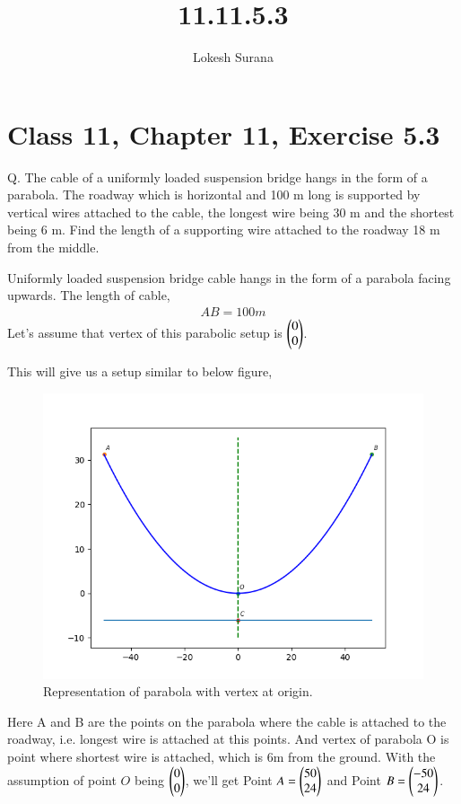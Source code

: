 \documentclass[journal,12pt,twocolumn]{IEEEtran}
\begin{document}
\vspace{3cm}
\title{11.11.5.3}
\author{Lokesh Surana}
\maketitle
\section*{Class 11, Chapter 11, Exercise 5.3}

Q. The cable of a uniformly loaded suspension bridge hangs in the form of a parabola. The roadway which is horizontal and 100 m long is supported by vertical wires attached to the cable, the longest wire being 30 m and the shortest being 6 m. Find the length of a supporting wire attached to the roadway 18 m from the middle.

\solution
Uniformly loaded suspension bridge cable hangs in the form of a parabola facing upwards.
The length of cable,
\begin{align}
    AB = 100m
\end{align}
Let's assume that vertex of this parabolic setup is $\begin{pmatrix}0\\0\end{pmatrix}$.

This will give us a setup similar to below figure,
\begin{figure}[!htb]
    \centering
    \includegraphics[width=\columnwidth]{figs/1.png}
    \caption{Representation of parabola with vertex at origin.}
    \label{fig:Cable}
\end{figure}

Here A and B are the points on the parabola where the cable is attached to the roadway, i.e. longest wire is attached at this points. And vertex of parabola O is point where shortest wire is attached, which is 6m from the ground.
With the assumption of point $O$ being $\begin{pmatrix}0\\0\end{pmatrix}$, we'll get Point $A = \begin{pmatrix}50\\24\end{pmatrix}$ and Point $B = \begin{pmatrix}-50\\24\end{pmatrix}$.  
\end{document}
